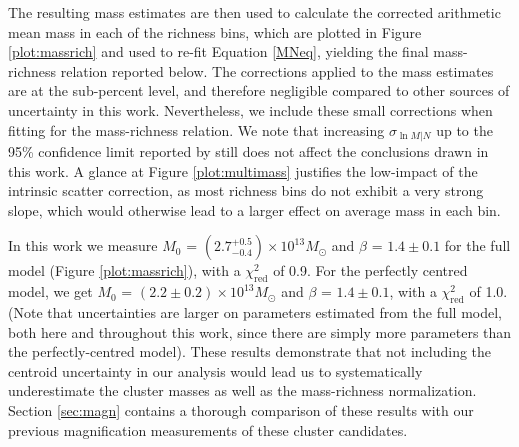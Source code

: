 The resulting mass estimates are then used to calculate the corrected arithmetic mean mass in each of the richness bins, which are plotted in Figure \ref{plot:massrich} and used to re-fit Equation \ref{MNeq}, yielding the final mass-richness relation reported below. The corrections applied to the mass estimates are at the sub-percent level, and therefore negligible compared to other sources of uncertainty in this work. Nevertheless, we include these small corrections when fitting for the mass-richness relation. We note that increasing $\sigma_{\ln M|N}$ up to the 95\% confidence limit reported by \citet{Rozo09a} still does not affect the conclusions drawn in this work. A glance at Figure \ref{plot:multimass} justifies the low-impact of the intrinsic scatter correction, as most richness bins do not exhibit a very strong slope, which would otherwise lead to a larger effect on average mass in each bin.

In this work we measure $M_0$ = $(2.7^{+0.5}_{-0.4}) \times 10^{13} M_{\odot}$ and $\beta$ = $1.4 \pm 0.1$ for the full model (Figure \ref{plot:massrich}), with a $\chi^2_{\mathrm{red}}$ of 0.9. For the perfectly centred model, we get $M_0$ = $(2.2 \pm 0.2) \times 10^{13} M_{\odot}$ and $\beta$ = $1.4 \pm 0.1$, with a $\chi^2_{\mathrm{red}}$ of 1.0. (Note that uncertainties are larger on parameters estimated from the full model, both here and throughout this work, since there are simply more parameters than the perfectly-centred model). These results demonstrate that not including the centroid uncertainty in our analysis would lead us to systematically underestimate the cluster masses as well as the mass-richness normalization. Section \ref{sec:magn} contains a thorough comparison of these results with our previous magnification measurements of these cluster candidates.




